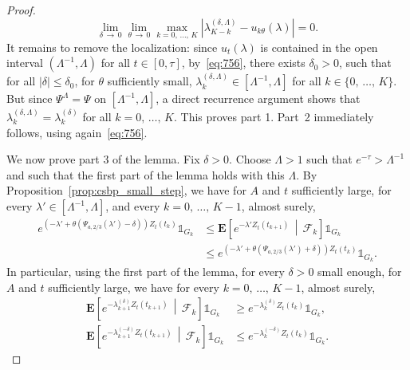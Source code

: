 \documentclass[10pt]{amsart}
\theoremstyle{definition}\newtheorem{defi}[theo]{Definition}\newtheorem{rema}[theo]{Remark}\newtheorem{exam}[theo]{Example}\newtheorem{exem}[theo]{Example}\newtheorem{nota}[theo]{Notation}
\newcommand*\E{\mathbf{E}}
\newcommand\F{\mathcal{F}}
\newcommand{\1} {\mathds{1}}
\renewcommand*\to{\rightarrow}
\begin{document}
\begin{proof}
\begin{equation}
\lim_{\delta\,\to\,0} \lim_{\theta\,\to\,0} \max_{k=0,\,\ldots,\,K} \left|\lambda_{K-k}^{(\delta,\Lambda)} - u_{k\theta}(\lambda)\right| = 0.
\end{equation}
It remains to remove the localization: since $u_t(\lambda)$ is contained in the open interval $(\Lambda^{-1},\Lambda)$ for all $t\in [0,\tau]$, by~\eqref{eq:756}, there exists $\delta_0>0$, such that for all $|\delta|\le \delta_0$, for $\theta$ sufficiently small, $\lambda_k^{(\delta,\Lambda)} \in [\Lambda^{-1},\Lambda]$ for all $k\in\{0,\,\ldots,\,K\}$. But since $\Psi^\Lambda = \Psi$ on $[\Lambda^{-1},\Lambda]$, a direct recurrence argument shows that $\lambda_k^{(\delta,\Lambda)} = \lambda_k^{(\delta)}$ for all $k=0,\,\ldots,\,K$. This proves part 1. Part~2 immediately follows, using again~\eqref{eq:756}.

We now prove part 3 of the lemma. Fix $\delta > 0$. Choose $\Lambda>1$ such that $e^{-\tau} > \Lambda^{-1}$ and such that the first part of the lemma holds with this $\Lambda$. By Proposition~\ref{prop:csbp_small_step}, we have for $A$ and $t$ sufficiently large, for every $\lambda'\in [\Lambda^{-1},\Lambda]$, and every $k=0,\,\ldots,\,K-1$, almost surely,
\begin{align*}
e^{\left(-\lambda' +\theta \left(\Psi_{a,2/3}\left(\lambda'\right)-\delta\right)\right) Z_t(t_k)}\1_{G_k} &\le \E\left[e^{-\lambda' Z_t\left(t_{k+1}\right)}\,\middle|\,\F_k\right]\1_{G_k}\\
&\le e^{\left(-\lambda' +\theta \left(\Psi_{a,2/3}\left(\lambda'\right)+\delta\right)\right) Z_t(t_k)}\1_{G_k}.
\end{align*}
In particular, using the first part of the lemma, for every $\delta>0$ small enough, for $A$ and $t$ sufficiently large, we have for every $k=0,\,\ldots,\,K-1$, almost surely,
\begin{align}\label{eq:753+}
\E\left[e^{-\lambda_{k+1}^{(\delta)} Z_t\left(t_{k+1}\right)}\,\middle|\,\F_k\right]\1_{G_k} &\ge e^{-\lambda_k^{(\delta)} Z_t(t_k)}\1_{G_k},\\\label{eq:753-}
\E\left[e^{-\lambda_{k+1}^{(-\delta)} Z_t\left(t_{k+1}\right)}\,\middle|\,\F_k\right]\1_{G_k} &\le e^{-\lambda_k^{(-\delta)} Z_t(t_k)}\1_{G_k}.
\end{align}


\end{proof}
\end{document}
